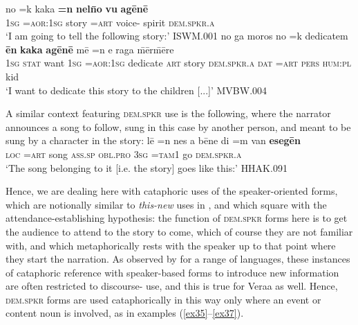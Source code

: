 \documentclass[output=paper
,modfonts
,nonflat]{langsci/langscibook}
\begin{document}
\ea	\label{ex35}
\gll		no		=k			kaka	\textbf{=n}		\textbf{nel\=no}	\textbf{vu{\textquotesingle}}	\textbf{ag\=en\=e}	\\
\textsc{1sg}	\textsc{=aor:1sg}	story	\textsc{=art}		voice-		spirit	\textsc{dem.spkr.a}	\\
\glt	`I am going to tell the following story:'		\hfill{ISWM.001}
\z
\ea	\label{ex36}
\gll no		ga		moros	no		=k 			dedicatem		\textbf{\=en} \textbf{kaka}	\textbf{ag\=en\=e}	m\=e	=n	e		raga		\=m\=er\=m\=ere 	\\
\textsc{1sg}	\textsc{stat}	want	\textsc{1sg}	\textsc{=aor:1sg}	dedicate		\textsc{art}	story	\textsc{dem.spkr.a}	\textsc{dat}	\textsc{=art}	\textsc{pers}	\textsc{hum:pl}	kid		\\
\glt	`I want to dedicate this story to the children [...]'		\hfill{MVBW.004}
\z

A similar context featuring \textsc{dem.spkr} use is the following, where the narrator announces a song to follow, sung in this case by another person, and meant to be sung by a character in the story:
\ea	\label{ex37}
\gll 	l\=e		=n 	nes 	{\textquotesingle}a			b\=ene 	di		=m 		van 	\textbf{eseg\=en} \\
	\textsc{loc}	\textsc{=art}	song	\textsc{ass.sp}	\textsc{obl.pro}	\textsc{3sg}	\textsc{=tam1}	go		\textsc{dem.spkr.a}	\\
\glt	`The song belonging to it [i.e. the story] goes like this:'			\hfill{HHAK.091}
\z

\noindent
Hence, we are dealing here with cataphoric uses of the speaker-oriented forms, which are notionally similar to \textit{this-new} \citep[93]{Wald1983} uses in , and which square with the attendance-establishing hypothesis: the function of \textsc{dem.spkr} forms here is to get the audience to attend to the story to come, which of course they are not familiar with, and which metaphorically rests with the speaker up to that point where they start the narration. As observed by \cite{Himmelmann1996} for a range of languages, these instances of cataphoric reference with speaker-based forms to introduce new information are often restricted to discourse- use, and this is true for Vera{\textquotesingle}a as well. Hence, \textsc{dem.spkr} forms are used cataphorically in this way only where an event or content noun is involved, as in examples (\ref{ex35}--\ref{ex37}).
\end{document}
